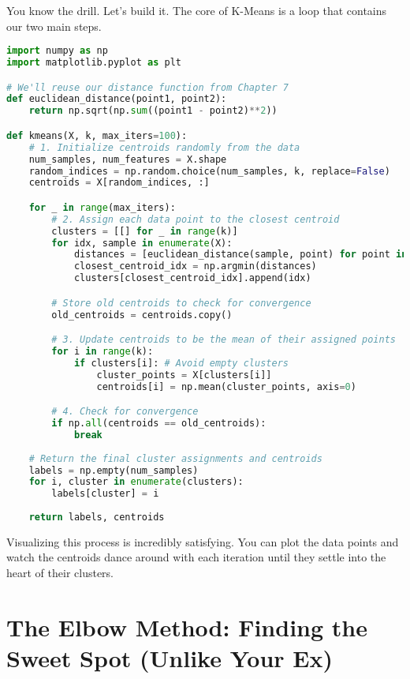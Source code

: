 \documentclass[11pt, letterpaper, openany]{book}
\begin{document}
You know the drill. Let's build it. The core of K-Means is a loop that contains our two main steps.

\begin{lstlisting}[language=Python]
import numpy as np
import matplotlib.pyplot as plt

# We'll reuse our distance function from Chapter 7
def euclidean_distance(point1, point2):
    return np.sqrt(np.sum((point1 - point2)**2))

def kmeans(X, k, max_iters=100):
    # 1. Initialize centroids randomly from the data
    num_samples, num_features = X.shape
    random_indices = np.random.choice(num_samples, k, replace=False)
    centroids = X[random_indices, :]

    for _ in range(max_iters):
        # 2. Assign each data point to the closest centroid
        clusters = [[] for _ in range(k)]
        for idx, sample in enumerate(X):
            distances = [euclidean_distance(sample, point) for point in centroids]
            closest_centroid_idx = np.argmin(distances)
            clusters[closest_centroid_idx].append(idx)

        # Store old centroids to check for convergence
        old_centroids = centroids.copy()

        # 3. Update centroids to be the mean of their assigned points
        for i in range(k):
            if clusters[i]: # Avoid empty clusters
                cluster_points = X[clusters[i]]
                centroids[i] = np.mean(cluster_points, axis=0)

        # 4. Check for convergence
        if np.all(centroids == old_centroids):
            break
            
    # Return the final cluster assignments and centroids
    labels = np.empty(num_samples)
    for i, cluster in enumerate(clusters):
        labels[cluster] = i
        
    return labels, centroids
\end{lstlisting}

Visualizing this process is incredibly satisfying. You can plot the data points and watch the centroids dance around with each iteration until they settle into the heart of their clusters.

\section{The Elbow Method: Finding the Sweet Spot (Unlike Your Ex)}
\end{document}
